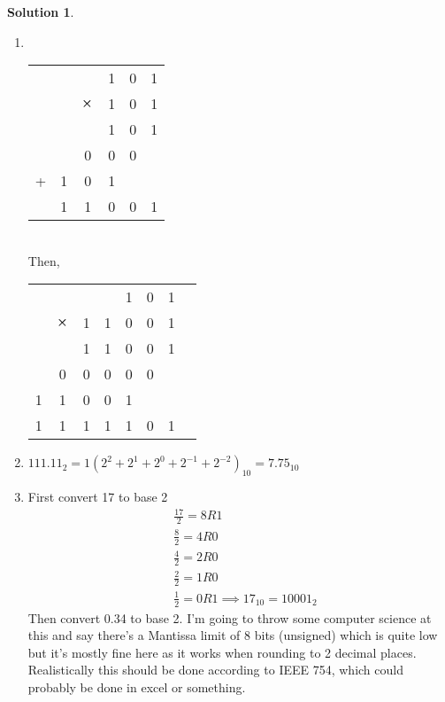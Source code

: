 \documentclass[10pt]{article}
\theoremstyle{definition}
\newtheorem{soln}{Solution}
\begin{document}
\begin{soln}
\begin{enumerate}[label=(\alph*)]
    \item ~\\
          \begin{tabular}{cccccc}
            ~ & ~ & ~        & 1 & 0 & 1   \\
            ~ & ~ & $\cross$ & 1 & 0 & 1   \\
            \hline
            ~ & ~ & ~        & 1 & 0 & 1   \\
            ~ & ~ & 0        & 0 & 0 & ~   \\ 
            + & 1 & 0        & 1 & ~ & ~   \\ 
            \hline
            ~ & 1 & 1        & 0 & 0 & 1 
          \end{tabular} ~\\
          Then, \\
          \begin{tabular}{cccccccc}
            ~ & ~        & ~ & ~ & 1 & 0 & 1         \\
            ~ & $\cross$ & 1 & 1 & 0 & 0 & 1         \\
            \hline
            ~ & ~        & 1 & 1 & 0 & 0 & 1         \\
            ~ & 0        & 0 & 0 & 0 & 0             \\
            1 & 1        & 0 & 0 & 1                 \\ 
            \hline
            1 & 1        & 1 & 1 & 1 & 0 & 1       
          \end{tabular}
    \item $111.11_2=1\left(2^2+2^1+2^0+2^{-1}+2^{-2}\right)_{10}=7.75_{10}$
    \item First convert 17 to base 2
          \begin{align*}
             & \frac{17}{2}=8R1                           \\
             & \frac{8}{2}=4R0                            \\
             & \frac{4}{2}=2R0                            \\
             & \frac{2}{2}=1R0                            \\
             & \frac{1}{2}=0R1 \implies 17_{10}=10001_2 
          \end{align*}
          Then convert 0.34 to base 2. I'm going to throw some computer science at this and say there's a Mantissa limit of 8 bits (unsigned) which is quite low but it's mostly fine here
          as it works when rounding to 2 decimal places. Realistically this should be done according to IEEE 754, which could probably be done in excel or something.

\end{enumerate}
\end{soln}
\end{document}
